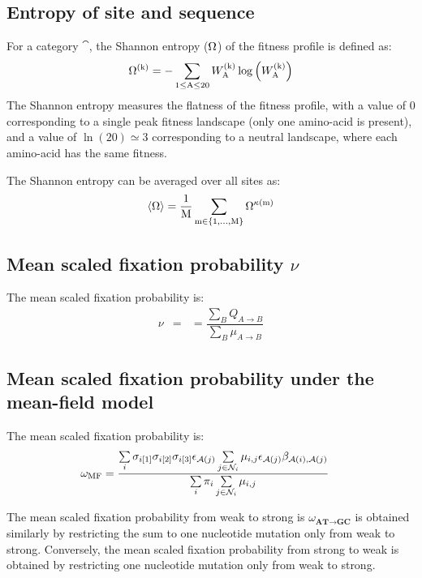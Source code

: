 \subsection{Entropy of site and sequence}
\label{subsec:entropy}

For a category $\cat$, the Shannon entropy (${\Omega}$) of the fitness profile is defined as:
\begin{equation}
    {\Omega}^{(\text{k})} = - \sum\limits_{1 \leq \text{A} \leq 20} W^{(\text{k})}_{\text{A}} \log \left( W^{(\text{k})}_{\text{A}} \right)
\end{equation}
The Shannon entropy measures the flatness of the fitness profile, with a value of $0$ corresponding to a single peak fitness landscape (only one amino-acid is present), and a value of $\ln(20)\simeq3$ corresponding to a \gls{neutral} landscape, where each amino-acid has the same fitness.

The Shannon entropy can be averaged over all sites as:
\begin{equation}
    \langle {\Omega} \rangle = \dfrac{1}{\text{M}}\sum\limits_{\text{m} \in \{1, \hdots, \text{M}\}} {\Omega}^{\kappa\left(\text{m}\right)}
\end{equation}

\subsection{Mean scaled fixation probability \texorpdfstring{$\nu$}{ν}}
\label{subsec:fixation-bias}
The mean scaled fixation probability is:
\begin{align}
    \nu & = & = \dfrac{ \sum\limits_{B} Q_{A \to B}}{ \sum\limits_{B} \mu_{A \to B}}
\end{align}

\subsection{Mean scaled fixation probability under the mean-field model}
\label{sec-mut-bias:mean-field-omega}

The mean scaled fixation probability is:
\begin{align}
    \omega_{\text{MF}} & = \dfrac{ \sum\limits_{i} \sigma_{{i}[1]}\sigma_{{i}[2]}\sigma_{{i}[3]} \epsilon_{\mathcal{A}({j})} \sum\limits_{j \in \mathcal{N}_{{i}}} \mu_{{i}, {j}} \epsilon_{\mathcal{A}({j})} \beta_{\mathcal{A}({i}), \mathcal{A}({j})} }{\sum\limits_{i} \pi_{i} \sum\limits_{j \in \mathcal{N}_{{i}} } \mu_{{i}, {j}}}
\end{align}

The mean scaled fixation probability from weak to strong is $\omega_{\textbf{AT} \rightarrow \textbf{GC}}$ is obtained similarly by restricting the sum to one nucleotide mutation only from weak to strong.
Conversely, the mean scaled fixation probability from strong to weak is obtained by restricting one nucleotide mutation only from weak to strong.

